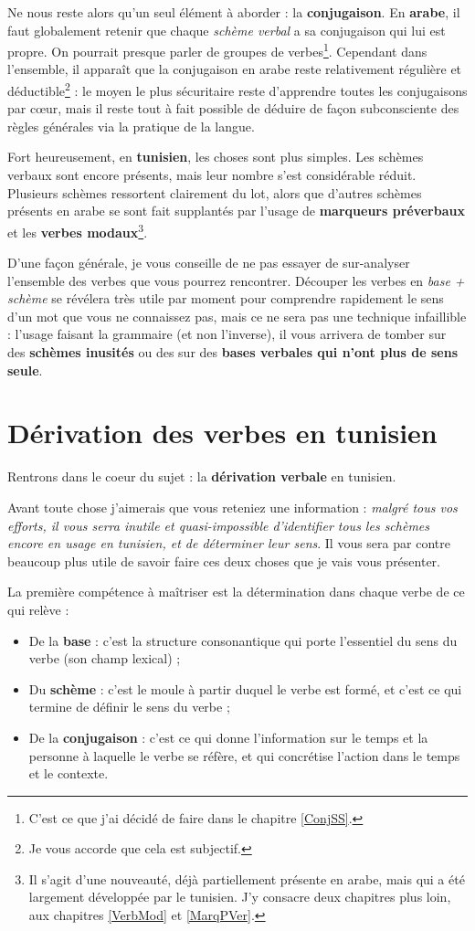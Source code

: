 Ne nous reste alors qu'un seul élément à aborder : la \textbf{conjugaison}. En \textbf{arabe}, il faut globalement retenir que chaque \textit{schème verbal} a sa conjugaison qui lui est propre. On pourrait presque parler de groupes de verbes\footnote{C'est ce que j'ai décidé de faire dans le chapitre \ref{ConjSS}.}. Cependant dans l'ensemble, il apparaît que la conjugaison en arabe reste relativement régulière et déductible\footnote{Je vous accorde que cela est subjectif.} : le moyen le plus sécuritaire reste d'apprendre toutes les conjugaisons par c\oe ur, mais il reste tout à fait possible de déduire de façon subconsciente des règles générales via la pratique de la langue. 

Fort heureusement, en \textbf{tunisien}, les choses sont plus simples. Les schèmes verbaux sont encore présents, mais leur nombre s'est considérable réduit. Plusieurs schèmes ressortent clairement du lot, alors que d'autres schèmes présents en arabe se sont fait supplantés par l'usage de \textbf{marqueurs préverbaux} et les \textbf{verbes modaux}\footnote{Il s'agit d'une nouveauté, déjà partiellement présente en arabe, mais qui a été largement développée par le tunisien. J'y consacre deux chapitres plus loin, aux chapitres \ref{VerbMod} et \ref{MarqPVer}.}.

D'une façon générale, je vous conseille de ne pas essayer de sur-analyser l'ensemble des verbes que vous pourrez rencontrer. Découper les verbes en \textit{base + schème} se révélera très utile par moment pour comprendre rapidement le sens d'un mot que vous ne connaissez pas, mais ce ne sera pas une technique infaillible : l'usage faisant la grammaire (et non l'inverse), il vous arrivera de tomber sur des \textbf{schèmes inusités} ou des sur des \textbf{bases verbales qui n'ont plus de sens seule}.

\section{Dérivation des verbes en tunisien}
Rentrons dans le coeur du sujet : la \textbf{dérivation verbale} en tunisien. 

Avant toute chose j'aimerais que vous reteniez une information : \textit{malgré tous vos efforts, il vous serra inutile et quasi-impossible d'identifier tous les schèmes encore en usage en tunisien, et de déterminer leur sens}. Il vous sera par contre beaucoup plus utile de savoir faire ces deux choses que je vais vous présenter. 

La première compétence à maîtriser est la détermination dans chaque verbe  de ce qui relève : 
\begin{itemize}
    \item De la \textbf{base} : c'est la structure consonantique qui porte l'essentiel du sens du verbe (son champ lexical) ; 
    \item Du \textbf{schème} : c'est le moule à partir duquel le verbe est formé, et c'est ce qui termine de définir le sens du verbe ; 
    \item De la \textbf{conjugaison} : c'est ce qui donne l'information sur le temps et la personne à laquelle le verbe se réfère, et qui concrétise l'action dans le temps et le contexte.
\end{itemize}

